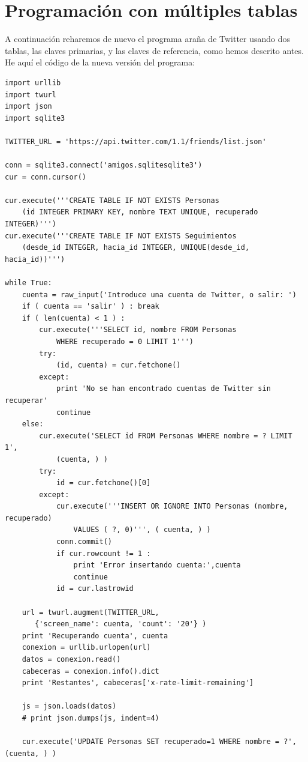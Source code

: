 \section{Programación con múltiples tablas}

A continuación reharemos de nuevo el programa araña de Twitter usando dos tablas, las claves
primarias, y las claves de referencia, como hemos descrito antes. He aquí el código
de la nueva versión del programa:

\beforeverb
\begin{verbatim}
import urllib
import twurl
import json
import sqlite3

TWITTER_URL = 'https://api.twitter.com/1.1/friends/list.json'

conn = sqlite3.connect('amigos.sqlitesqlite3')
cur = conn.cursor()

cur.execute('''CREATE TABLE IF NOT EXISTS Personas 
    (id INTEGER PRIMARY KEY, nombre TEXT UNIQUE, recuperado INTEGER)''')
cur.execute('''CREATE TABLE IF NOT EXISTS Seguimientos 
    (desde_id INTEGER, hacia_id INTEGER, UNIQUE(desde_id, hacia_id))''')

while True:
    cuenta = raw_input('Introduce una cuenta de Twitter, o salir: ')
    if ( cuenta == 'salir' ) : break
    if ( len(cuenta) < 1 ) :
        cur.execute('''SELECT id, nombre FROM Personas
            WHERE recuperado = 0 LIMIT 1''')
        try:
            (id, cuenta) = cur.fetchone()
        except:
            print 'No se han encontrado cuentas de Twitter sin recuperar'
            continue
    else:
        cur.execute('SELECT id FROM Personas WHERE nombre = ? LIMIT 1', 
            (cuenta, ) )
        try:
            id = cur.fetchone()[0]
        except:
            cur.execute('''INSERT OR IGNORE INTO Personas (nombre, recuperado) 
                VALUES ( ?, 0)''', ( cuenta, ) )
            conn.commit()
            if cur.rowcount != 1 : 
                print 'Error insertando cuenta:',cuenta
                continue
            id = cur.lastrowid

    url = twurl.augment(TWITTER_URL, 
       {'screen_name': cuenta, 'count': '20'} )
    print 'Recuperando cuenta', cuenta
    conexion = urllib.urlopen(url)
    datos = conexion.read()
    cabeceras = conexion.info().dict
    print 'Restantes', cabeceras['x-rate-limit-remaining']

    js = json.loads(datos)
    # print json.dumps(js, indent=4)

    cur.execute('UPDATE Personas SET recuperado=1 WHERE nombre = ?', (cuenta, ) )


\end{verbatim}
